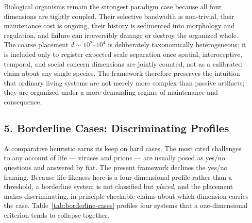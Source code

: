 \documentclass[Afour,sageh,times,doublespace]{sagej}
\begin{document}
Biological organisms remain the strongest paradigm case because all four dimensions are tightly coupled. Their selective bandwidth is non-trivial, their maintenance cost is ongoing, their history is sedimented into morphology and regulation, and failure can irreversibly damage or destroy the organized whole. The coarse placement \(d \sim 10^{2}\text{--}10^{4}\) is deliberately taxonomically heterogeneous; it is included only to register expected scale separation once spatial, interoceptive, temporal, and social concern dimensions are jointly counted, not as a calibrated claim about any single species. The framework therefore preserves the intuition that ordinary living systems are not merely more complex than passive artifacts; they are organized under a more demanding regime of maintenance and consequence.

\subsection{5. Borderline Cases: Discriminating Profiles}\label{borderline-cases-discriminating-profiles}

A comparative heuristic earns its keep on hard cases. The most cited challenges to any account of life --- viruses and prions --- are usually posed as yes/no questions and answered by fiat. The present framework declines the yes/no framing. Because life-likeness here is a four-dimensional profile rather than a threshold, a borderline system is not classified but \emph{placed}, and the placement makes discriminating, in-principle checkable claims about which dimension carries the case. Table~\ref{tab:borderline-cases} profiles four systems that a one-dimensional criterion tends to collapse together.
\end{document}
